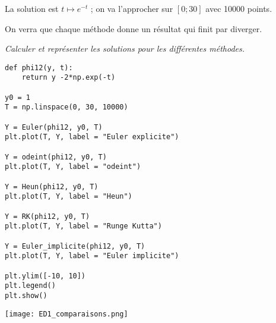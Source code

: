 La solution est $t \mapsto e^{-t}$ ; on va l'approcher sur $[0;30]$ avec 10000 points.

On verra que chaque méthode donne un résultat qui finit par diverger.
\begin{Exercise}\it
Calculer et représenter les solutions pour les différentes méthodes.
\end{Exercise}
\begin{Answer}
\begin{lstlisting}
def phi12(y, t):
    return y -2*np.exp(-t)

y0 = 1
T = np.linspace(0, 30, 10000)

Y = Euler(phi12, y0, T)
plt.plot(T, Y, label = "Euler explicite")

Y = odeint(phi12, y0, T)
plt.plot(T, Y, label = "odeint")

Y = Heun(phi12, y0, T)
plt.plot(T, Y, label = "Heun")

Y = RK(phi12, y0, T)
plt.plot(T, Y, label = "Runge Kutta")

Y = Euler_implicite(phi12, y0, T)
plt.plot(T, Y, label = "Euler implicite")

plt.ylim([-10, 10])
plt.legend()
plt.show()
\end{lstlisting}
\begin{center}
\texttt{[image: ED1\_comparaisons.png]}
\end{center}
\end{Answer}

